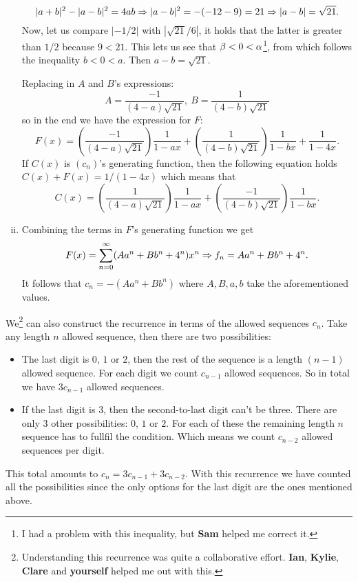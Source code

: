 \documentclass[12pt]{memoir}
\begin{document}
\begin{ptcbr}
\begin{enumerate}[i)]
$$|a+b|^2-|a-b|^2=4ab\Rightarrow|a-b|^2=-(-12-9)=21\Rightarrow|a-b|=\sqrt{21}.$$
Now, let us compare $|-1/2|$ with $|\sqrt{21}/6|$, it holds that the latter is greater than $1/2$ because $9<21$. This lets us see that $\beta<0<\alpha$\footnote{I had a problem with this inequality, but \textbf{Sam} helped me correct it.}, from which follows the inequality $b<0<a$. Then $a-b=\sqrt{21}$.
\iffalse
We also have that $\bt<-\frac{1}{2}<\al$, so $b>-2>a$. This means that $a-b=-\sqrt{21}$.\fi 
Replacing in $A$ and $B$'s expressions:
$$A=\frac{-1}{(4-a)\sqrt{21}},\ B=\frac{1}{(4-b)\sqrt{21}}$$
so in the end we have the expression for $F$:
$$F(x)=\left(\frac{-1}{(4-a)\sqrt{21}}\right)\frac{1}{1-ax}+\left(\frac{1}{(4-b)\sqrt{21}}\right)\frac{1}{1-bx}+\frac{1}{1-4x}.$$
If $C(x)$ is $(c_n)$'s generating function, then the following equation holds $C(x)+F(x)=1/(1-4x)$ which means that
$$C(x)=\left(\frac{1}{(4-a)\sqrt{21}}\right)\frac{1}{1-ax}
+\left(\frac{-1}{(4-b)\sqrt{21}}\right)\frac{1}{1-bx}.$$
\item Combining the terms in $F$'s generating function we get 
$$F(x)=\sum_{n=0}^\infty(Aa^n+Bb^n+4^n)x^n\Rightarrow f_n=Aa^n+Bb^n+4^n.$$
It follows that $c_n=-(Aa^n+Bb^n)$ where $A,B,a,b$ take the aforementioned values.
\end{enumerate}
\end{ptcbr}

\begin{ptcb}
   We\footnote{Understanding this recurrence was quite a collaborative effort. \textbf{Ian}, \textbf{Kylie}, \textbf{Clare} and \textbf{yourself} helped me out with this.} can also construct the recurrence in terms of the allowed sequences $c_n$. Take any length $n$ allowed sequence, then there are two possibilities:
   \begin{itemize}
      \itemsep=-0.4em
      \item The last digit is $0$, $1$ or $2$, then the rest of the sequence is a length $(n-1)$ allowed sequence. For each digit we count $c_{n-1}$ allowed sequences. So in total we have $3c_{n-1}$ allowed sequences.
      \item If the last digit is $3$, then the second-to-last digit can't be three. There are only $3$ other possibilities: $0$, $1$ or $2$. For each of these the remaining length $n$ sequence has to fullfil the condition. Which means we count $c_{n-2}$ allowed sequences per digit.
   \end{itemize}
   This total amounts to $c_n=3c_{n-1}+3c_{n-2}$. With this recurrence we have counted all the possibilities since the only options for the last digit are the ones mentioned above. 
\end{ptcb}
\end{document}
